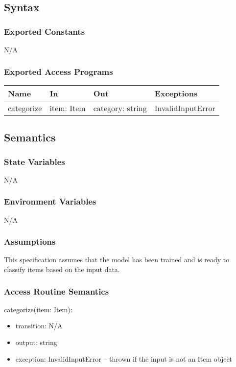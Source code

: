 \documentclass[12pt, titlepage]{article}
\begin{document}
\subsection{Syntax}

\subsubsection{Exported Constants}
N/A

\subsubsection{Exported Access Programs}

\begin{center}
\begin{tabular}{p{4cm} p{4cm} p{4cm} p{4cm}}
\hline
\textbf{Name} & \textbf{In} & \textbf{Out} & \textbf{Exceptions} \\
\hline
categorize & item: Item & category: string & InvalidInputError \\
\hline
\end{tabular}
\end{center}

\subsection{Semantics}

\subsubsection{State Variables}
N/A

\subsubsection{Environment Variables}
N/A

\subsubsection{Assumptions}
This specification assumes that the model has been trained and is ready to
classify items based on the input data.

\subsubsection{Access Routine Semantics}

\noindent categorize(item: Item):
\begin{itemize}
\item transition: N/A 
\item output: string 
\item exception: InvalidInputError -- thrown if the input is not an Item object
\end{itemize}
\end{document}
